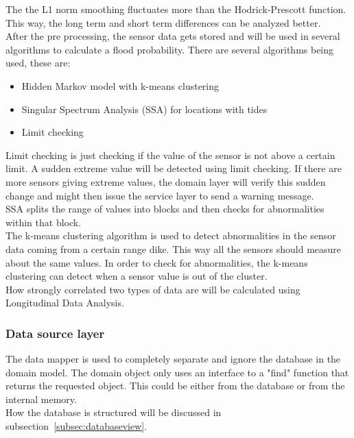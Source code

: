 The the L1 norm smoothing fluctuates more than the Hodrick-Prescott function. This way, the long term and short term differences can be analyzed better.\\

%
After the pre processing, the sensor data gets stored and will be used in several algorithms to calculate a flood probability.
There are several algorithms being used, these are:
\begin{itemize}
	\item Hidden Markov model with k-means clustering
	\item Singular Spectrum Analysis (SSA) for locations with tides
	\item Limit checking
\end{itemize}

Limit checking is just checking if the value of the sensor is not above a certain limit. A sudden extreme value will be detected using limit checking. If there are more sensors giving extreme values, the domain layer will verify this sudden change and might then issue the service layer to send a warning message.\\
SSA splits the range of values into blocks and then checks for abnormalities within that block.\\
The k-means clustering algorithm is used to detect abnormalities in the sensor data coming from a certain range dike. This way all the sensors should measure about the same values. In order to check for abnormalities, the k-means clustering can detect when a sensor value is out of the cluster.\\

How strongly correlated two types of data are will be calculated using Longitudinal Data Analysis.

\subsubsection*{Data source layer}
The data mapper \cite{Fowler:2002:PEA:579257} is used to completely separate and ignore the database in the domain model. The domain object only uses an interface to a "find" function that returns the requested object. This could be either from the database or from the internal memory.\\
How the database is structured will be discussed in subsection~\ref{subsec:databaseview}.

